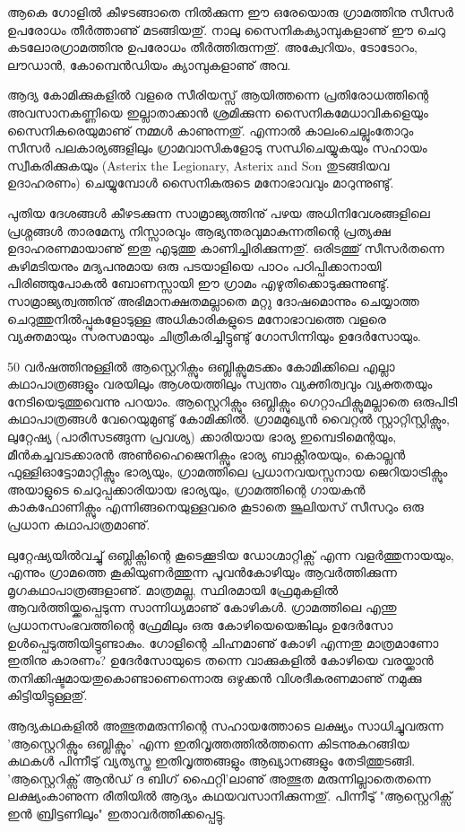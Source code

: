 ആകെ ഗോളില്‍ കീഴടങ്ങാതെ നില്‍ക്കുന്ന ഈ ഒരേയൊരു ഗ്രാമത്തിനു സീസര്‍ ഉപരോധം തീര്‍ത്താണു് മടങ്ങിയതു്. 
നാലു സൈനികക്യാമ്പുകളാണു് ഈ ചെറു കടലോരഗ്രാമത്തിനു ഉപരോധം തീര്‍ത്തിരുന്നതു്. അക്വേറിയം, ടോടോറം, 
ലൗഡാന്‍, കോമ്പെന്‍ഡിയം ക്യാമ്പുകളാണു് അവ.

ആദ്യ കോമിക്കുകളില്‍ വളരെ സീരിയസ്സ് ആയിത്തന്നെ പ്രതിരോധത്തിന്റെ അവസാനകണ്ണിയെ ഇല്ലാതാക്കാന്‍ 
ശ്രമിക്കുന്ന സൈനികമേധാവികളെയും സൈനികരെയുമാണു് നമ്മള്‍ കാണുന്നതു്. എന്നാല്‍ കാലംചെല്ലുംതോറും 
സീസര്‍ പലകാര്യങ്ങളിലും ഗ്രാമവാസികളോടു സന്ധിചെയ്യുകയും സഹായം സ്വീകരിക്കുകയും (Asterix the
Legionary, Asterix and Son തുടങ്ങിയവ ഉദാഹരണം) ചെയ്യുമ്പോള്‍ സൈനികരുടെ മനോഭാവവും മാറുന്നുണ്ടു്.

പുതിയ ദേശങ്ങള്‍ കീഴടക്കുന്ന സാമ്രാജ്യത്തിനു് പഴയ അധിനിവേശങ്ങളിലെ പ്രശ്നങ്ങള്‍ താരമേന്യ നിസ്സാരവും 
ആഭ്യന്തരവുമാകുന്നതിന്റെ പ്രത്യക്ഷ ഉദാഹരണമായാണു് ഇതു എടുത്തു കാണിച്ചിരിക്കുന്നതു്. ഒരിടത്തു് സീസര്‍തന്നെ 
കുഴിമടിയനും മദ്യപനുമായ ഒരു പടയാളിയെ പാഠം പഠിപ്പിക്കാനായി പിരിഞ്ഞുപോകല്‍ ബോണസ്സായി ഈ ഗ്രാമം 
എഴുതിക്കൊടുക്കുന്നുണ്ടു്. സാമ്രാജ്യത്വത്തിനു് അഭിമാനക്ഷതമല്ലാതെ മറ്റു ദോഷമൊന്നും ചെയ്യാത്ത 
ചെറുത്തുനില്‍പ്പുകളോടുള്ള അധികാരികളുടെ മനോഭാവത്തെ വളരെ വ്യക്തമായും സരസമായും ചിത്രീകരിച്ചിട്ടുണ്ടു് 
ഗോസിന്നിയും ഉദേര്‍സോയും.

50 വര്‍ഷത്തിനുള്ളില്‍ ആസ്റ്റെറിക്സും ഒബ്ലിക്സുമടക്കം കോമിക്കിലെ എല്ലാ കഥാപാത്രങ്ങളും വരയിലും ആശയത്തിലും സ്വന്തം 
വ്യക്തിത്വവും വ്യക്തതയും നേടിയെടുത്തുവെന്നു പറയാം. ആസ്റ്റെറിക്സും ഒബ്ലിക്സും ഗെറ്റാഫിക്സുമല്ലാതെ ഒരുപിടി കഥാപാത്രങ്ങള്‍ 
വേറെയുമുണ്ടു് കോമിക്കില്‍. ഗ്രാമമുഖ്യന്‍ വൈറ്റല്‍ സ്റ്റാറ്റിസ്റ്റിക്സും, ലുറ്റേഷ്യ (പാരീസടങ്ങുന്ന പ്രവശ്യ) ക്കാരിയായ ഭാര്യ
ഇമ്പെടിമെന്റയും, മീന്‍കച്ചവടക്കാരന്‍ അണ്‍ഹൈജെനിക്സും ഭാര്യ ബാക്റ്റീരയയും, കൊല്ലന്‍ ഫുള്ളിഓട്ടോമാറ്റിക്സും ഭാര്യയും, 
ഗ്രാമത്തിലെ പ്രധാനവയസ്സനായ ജെറിയാട്രിക്സും അയാളുടെ ചെറുപ്പക്കാരിയായ ഭാര്യയും, ഗ്രാമത്തിന്റെ ഗായകന്‍ 
കാകഫോണിക്സും എന്നിങ്ങനെയുള്ളവരെ കൂടാതെ ജൂലിയസ് സീസറും ഒരു പ്രധാന കഥാപാത്രമാണു്.


ലുറ്റേഷ്യയില്‍വച്ചു് ഒബ്ലിക്സിന്റെ കൂടെക്കൂടിയ ഡോഗ്മാറ്റിക്സ് എന്ന വളര്‍ത്തുനായയും, എന്നും ഗ്രാമത്തെ കൂകിയുണര്‍ത്തുന്ന 
പൂവന്‍കോഴിയും ആവര്‍ത്തിക്കുന്ന മൃഗകഥാപാത്രങ്ങളാണു്. മാത്രമല്ല, സ്ഥിരമായി ഫ്രേമുകളില്‍ ആവര്‍ത്തിയ്ക്കപ്പെടുന്ന 
സാന്നിധ്യമാണു് കോഴികള്‍. ഗ്രാമത്തിലെ എന്തു പ്രധാനസംഭവത്തിന്റെ ഫ്രേമിലും ഒരു കോഴിയെയെങ്കിലും ഉദേര്‍സോ 
ഉള്‍പ്പെടുത്തിയിട്ടുണ്ടാകും. ഗോളിന്റെ ചിഹ്നമാണു് കോഴി എന്നതു മാത്രമാണോ ഇതിനു കാരണം? ഉദേര്‍സോയുടെ തന്നെ 
വാക്കുകളില്‍ കോഴിയെ വരയ്ക്കാന്‍ തനിക്കിഷ്ടമായതുകൊണ്ടാണെന്നൊരു ഒഴുക്കന്‍ വിശദീകരണമാണു് നമുക്കു കിട്ടിയിട്ടുള്ളതു്.

ആദ്യകഥകളില്‍ അത്ഭുതമരുന്നിന്റെ സഹായത്തോടെ ലക്ഷ്യം സാധിച്ചുവരുന്ന 'ആസ്റ്റെറിക്സും ഒബ്ലിക്സും' എന്ന 
ഇതിവൃത്തത്തില്‍ത്തന്നെ കിടന്നുകറങ്ങിയ കഥകള്‍ പിന്നീടു് വ്യത്യസ്ത ഇതിവൃത്തങ്ങളും ആഖ്യാനങ്ങളും തേടിത്തുടങ്ങി. 
'ആസ്റ്റെറിക്സ് ആന്‍ഡ് ദ ബിഗ് ഫൈറ്റി'ലാണു് അത്ഭുത മരുന്നില്ലാതെതന്നെ ലക്ഷ്യംകാണുന്ന രീതിയില്‍ ആദ്യം 
കഥയവസാനിക്കുന്നതു്. പിന്നീടു് "ആസ്റ്റെറിക്സ് ഇന്‍ ബ്രിട്ടണിലും" ഇതാവര്‍ത്തിക്കപ്പെട്ടു.

